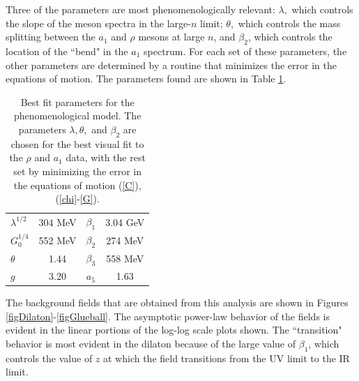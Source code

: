 Three of the parameters are most phenomenologically relevant: $\lambda,$ which controls the slope of the meson spectra in the large-$n$ limit; $\theta,$ which controls the mass splitting between the $a_1$ and $\rho$ mesons at large $n$, and $\beta_2$, which controls the location of the ``bend" in the $a_1$ spectrum.
For each set of these parameters, the other parameters are determined by a routine that minimizes the error in the equations of motion. 
The parameters found are shown in Table \ref{tabParam}.

\begin{table}[htb]
\begin{center}
\begin{tabular}{| l | c || c | c | }
\hline
  $\lambda^{1/2}$ & $304$ MeV & $\beta_1$ & 3.04 GeV  \\
  $G_0^{1/4}$ & 552 MeV & $\beta_2$ & 274 MeV \\
  $ \theta $& 1.44 & $\beta_3$ & 558 MeV \\
  $g $& 3.20 & $a_5$ & 1.63 \\
  \hline
\end{tabular}
\caption{Best fit parameters for the phenomenological model. 
The parameters $\lambda, \theta,$ and $ \beta_2$ are chosen for the best visual fit to the $\rho$ and $a_1$ data, with the rest set by minimizing the error in the equations of motion (\ref{C}), (\ref{chi}-\ref{G}). }
\label{tabParam}
\end{center}
\end{table}

The background fields that are obtained from this analysis are shown in Figures \ref{figDilaton}-\ref{figGlueball}. 
The asymptotic power-law behavior of the fields is evident in the linear portions of the log-log scale plots shown.
 The ``transition" behavior is most evident in the dilaton because of the large value of $\beta_1$, which controls the value of $z$ at which the field transitions from the UV limit to the IR limit. 

\clearpage

